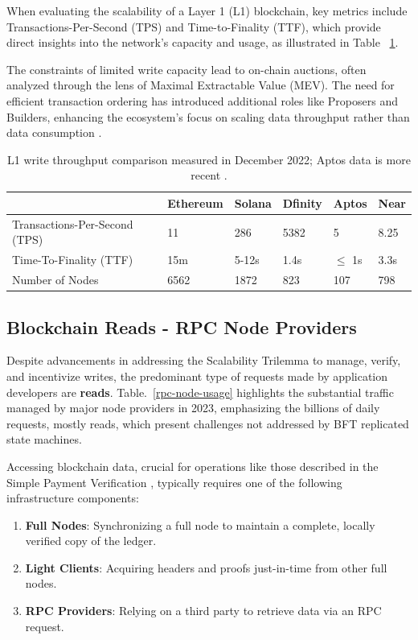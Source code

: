 \documentclass[runningheads]{llncs}
\begin{document}
When evaluating the scalability of a Layer 1 (L1) blockchain, key metrics include Transactions-Per-Second (TPS) and Time-to-Finality (TTF), which provide direct insights into the network's capacity and usage, as illustrated in Table ~\ref{l1-throughput}.

The constraints of limited write capacity lead to on-chain auctions, often analyzed through the lens of Maximal Extractable Value (MEV). The need for efficient transaction ordering has introduced additional roles like Proposers and Builders, enhancing the ecosystem's focus on scaling data throughput rather than data consumption \cite{kulkarni2023theory} \cite{heimbach2023ethereums}.

\begin{table}
    \centering    
    \begin{tabular}{|l|P{1.5cm}|P{1.2cm}|P{1.2cm}|P{1.1cm}|P{1cm}|}
        \hline & Ethereum & Solana & Dfinity & Aptos & Near \\
        \hline
            Transactions-Per-Second (TPS) & 11 & 286 & 5382 & 5 & 8.25  \\
            Time-To-Finality (TTF) &  15m & 5-12s & 1.4s & $\le$ 1s & 3.3s \\
            Number of Nodes &  6562 & 1872 &  823 & 107 & 798 \\
        \hline
    \end{tabular}
    \caption{L1 write throughput comparison measured in December 2022; Aptos data is more recent \cite{internetcomputerComparisonInternet} \cite{aptoslabsAptosExplorer}.}
    \label{l1-throughput}
\end{table}

\subsection{Blockchain Reads - RPC Node Providers}

Despite advancements in addressing the Scalability Trilemma to manage, verify, and incentivize writes, the predominant type of requests made by application developers are \textbf{reads}. Table.~\ref{rpc-node-usage} highlights the substantial traffic managed by major node providers in 2023, emphasizing the billions of daily requests, mostly reads, which present challenges not addressed by BFT replicated state machines.

Accessing blockchain data, crucial for operations like those described in the Simple Payment Verification \cite{nakamoto2008bitcoin}, typically requires one of the following infrastructure components:
\begin{enumerate}
    \item \textbf{Full Nodes}: Synchronizing a full node to maintain a complete, locally verified copy of the ledger.
    \item \textbf{Light Clients}: Acquiring headers and proofs just-in-time from other full nodes.
    \item \textbf{RPC Providers}: Relying on a third party to retrieve data via an RPC request.
\end{enumerate}
\end{document}
